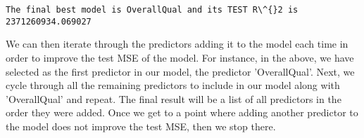 \documentclass[11pt]{article}
\begin{document}
    \begin{Verbatim}[commandchars=\\\{\}]
The final best model is OverallQual and its TEST R\^{}2 is 2371260934.069027

    \end{Verbatim}

    We can then iterate through the predictors adding it to the model each
time in order to improve the test MSE of the model. For instance, in the
above, we have selected as the first predictor in our model, the
predictor 'OverallQual'. Next, we cycle through all the remaining
predictors to include in our model along with 'OverallQual' and repeat.
The final result will be a list of all predictors in the order they were
added. Once we get to a point where adding another predictor to the
model does not improve the test MSE, then we stop there.
\end{document}
